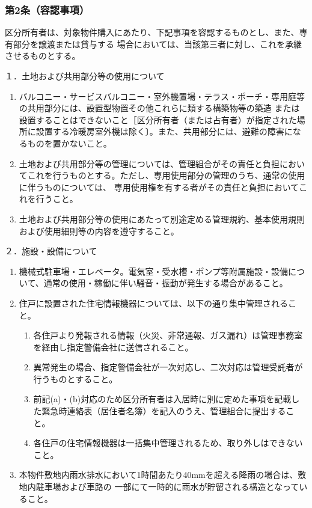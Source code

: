 \documentclass[
  luatex,
  paper=a4paper,
  fontsize=11pt,
  jafontsize=11pt,
  jlreq_notes,
]{jlreq}
\begin{document}
  \subsubsection*{第2条（容認事項）}
  区分所有者は、対象物件購入にあたり、下記事項を容認するものとし、また、専有部分を譲渡または貸与する
  場合においては、当該第三者に対し、これを承継させるものとする。

  \noindent
  １．土地および共用部分等の使用について
  \begin{enumerate}
    \item バルコニー・サービスバルコニー・室外機置場・テラス・ポーチ・専用庭等の共用部分には、設置型物置その他これらに類する構築物等の築造
    または設置することはできないこと［区分所有者（または占有者）が指定された場所に設置する冷暖房室外機は除く〕。また、共用部分には、避難の障害になるものを置かないこと。
    \item 土地および共用部分等の管理については、管理組合がその責任と負担においてこれを行うものとする。ただし、専用使用部分の管理のうち、通常の使用に伴うものについては、
          専用使用権を有する者がその責任と負担においてこれを行うこと。
    \item 土地および共用部分等の使用にあたって別途定める管理規約、基本使用規則および使用細則等の内容を遵守すること。
  \end{enumerate}
  ２．施設・設備について
  \begin{enumerate}
    \item 機械式駐車場・エレベータ。電気室・受水槽・ポンプ等附属施設・設備について、通常の使用・稼働に伴い騒音・振動が発生する場合があること。
    \item 住戸に設置された住宅情報機器については、以下の通り集中管理されること。
      \begin{enumerate}
        \item 各住戸より発報される情報（火災、非常通報、ガス漏れ）は管理事務室を経由し指定警備会社に送信されること。
        \item 異常発生の場合、指定警備会社が一次対応し、二次対応は管理受託者が行うものとすること。
        \item 前記(a)・(b)対応のため区分所有者は入居時に別に定めた事項を記載した緊急時連絡表（居住者名簿）を記入のうえ、管理組合に提出すること。
        \item 各住戸の住宅情報機器は一括集中管理されるため、取り外しはできないこと。
      \end{enumerate}
  \item 本物件敷地内雨水排水において1時間あたり40mmを超える降雨の場合は、敷地内駐車場および車路の
        一部にて一時的に雨水が貯留される構造となっていること。
  \end{enumerate}
\end{document}
